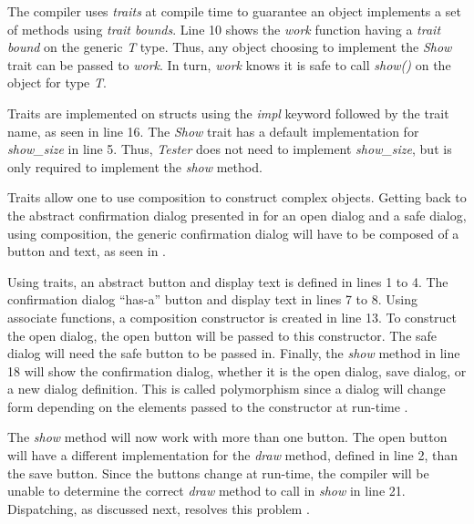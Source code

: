 
The compiler uses \textit{traits} at compile time to guarantee an object implements a set of methods using \textit{trait bounds}.
Line 10 shows the \textit{work} function having a \textit{trait bound} on the generic \textit{T} type.
Thus, any object choosing to implement the \textit{Show} trait can be passed to \textit{work}.
In turn, \textit{work} knows it is safe to call \textit{show()} on the object for type \textit{T}.


Traits are implemented on structs using the \textit{impl} keyword followed by the trait name, as seen in line 16.
The \textit{Show} trait has a default implementation for \textit{show\_size} in line 5.
Thus, \textit{Tester} does not need to implement \textit{show\_size}, but is only required to implement the \textit{show} method.

Traits allow one to use composition to construct complex objects.
Getting back to the abstract confirmation dialog presented in  for an open dialog and a safe dialog, using composition, the generic confirmation dialog will have to be composed of a button and text, as seen in .


Using traits, an abstract button and display text is defined in lines 1 to 4.
The confirmation dialog ``has-a'' \cite{malik_09_01} button and display text in lines 7 to 8.
Using associate functions\footnotemark[\ref{associate}], a composition constructor is created in line 13.
To construct the open dialog, the open button will be passed to this constructor.
The safe dialog will need the safe button to be passed in.
Finally, the \textit{show} method in line 18 will show the confirmation dialog, whether it is the open dialog, save dialog, or a new dialog definition.
This is called polymorphism since a dialog will change form depending on the elements passed to the constructor at run-time \cite{savitch_15_01,malik_09_01,gamma_94_01}.

The \textit{show} method will now work with more than one button.
The open button will have a different implementation for the \textit{draw} method, defined in line 2, than the save button.
Since the buttons change at run-time, the compiler will be unable to determine the correct \textit{draw} method to call in \textit{show} in line 21.
Dispatching, as discussed next, resolves this problem \cite{pierce_02_01}.

